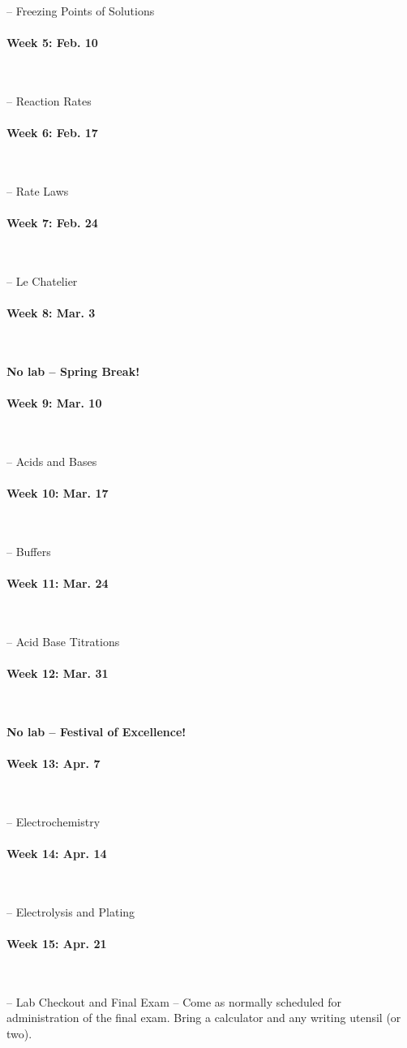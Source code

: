 \documentclass[12pt, letterpaper]{article}
\begin{document}
-- Freezing Points of Solutions

\paragraph{Week 5: Feb. 10}~

-- Reaction Rates

\paragraph{Week 6: Feb. 17}~

-- Rate Laws

\paragraph{Week 7: Feb. 24}~

-- Le Chatelier

\paragraph{Week 8: Mar. 3}~

\textbf{No lab -- Spring Break!}

\paragraph{Week 9: Mar. 10}~

-- Acids and Bases

\paragraph{Week 10: Mar. 17}~

-- Buffers

\paragraph{Week 11: Mar. 24}~

-- Acid Base Titrations

\paragraph{Week 12: Mar. 31}~

\textbf{No lab -- Festival of Excellence!}

\paragraph{Week 13: Apr. 7}~

-- Electrochemistry

\paragraph{Week 14: Apr. 14}~

-- Electrolysis and Plating

\paragraph{Week 15: Apr. 21}~

-- Lab Checkout and Final Exam -- Come as normally scheduled for administration of the final exam. Bring a calculator and any writing utensil (or two).
\end{document}
